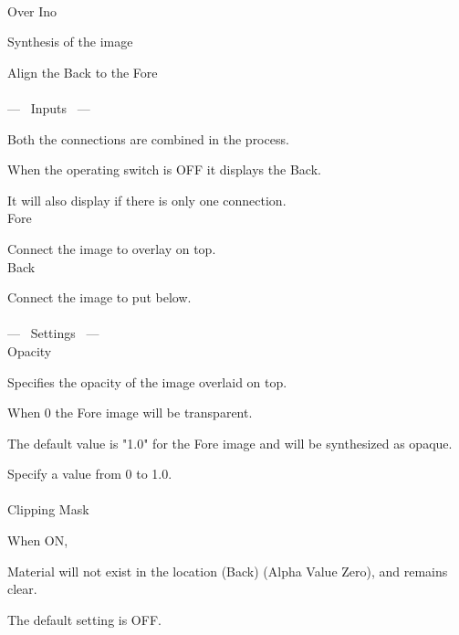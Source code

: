 \documentclass[a4paper,12pt]{article}
\begin{document}
\thispagestyle{empty}

\Large
\noindent \\
Over Ino\medskip
\par
\normalsize
Synthesis of the image\par
Align the Back to the Fore\\
\\
--- \ Inputs \ ---\par
Both the connections are combined in the process.\par
When the operating switch is OFF it displays the Back.\par
It will also display if there is only one connection.\\
Fore\par
Connect the image to overlay on top.\\
Back\par
Connect the image to put below.\\
\\
--- \ Settings \ ---\\
Opacity\par
Specifies the opacity of the image overlaid on top.\par
When 0 the Fore image will be transparent.\par
The default value is "1.0" for the Fore image and will be synthesized as opaque.\par
Specify a value from 0 to 1.0.\\
\\
Clipping Mask\par
When ON,\par
Material will not exist in the location (Back) (Alpha Value Zero), and remains clear.\par
The default setting is OFF.
\end{document}

